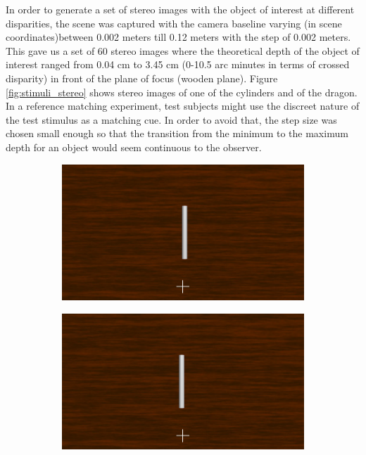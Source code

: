 In order to generate a set of stereo images with the object of interest at different disparities, the scene was captured with the camera baseline varying (in scene coordinates)between 0.002 meters till 0.12 meters with the step of 0.002 meters. This gave us a set of 60 stereo images where the theoretical depth of the object of interest ranged from 0.04 cm to 3.45 cm (0-10.5 arc minutes in terms of crossed disparity) in front of the plane of focus (wooden plane). Figure \ref{fig:stimuli_stereo} shows stereo images of one of the cylinders and of the dragon. In a reference matching experiment, test subjects might use the discreet nature of the test stimulus as a matching cue. In order to avoid that, the step size was chosen small enough so that the transition from the minimum to the maximum depth for an object would seem continuous to the observer.
\begin{figure}[htbp]
    \begin{subfigure}[b]{0.5\textwidth}
        \includegraphics[width=\textwidth]{./Template_Figures/57L.png}
        \caption{}\label{fig:left_stereo_cyl}
    \end{subfigure}
    \begin{subfigure}[b]{0.5\textwidth}
        \includegraphics[width=\textwidth]{./Template_Figures/57R}
        \caption{}\label{fig:right_stereo_cyl}
    \end{subfigure}


\end{figure}
